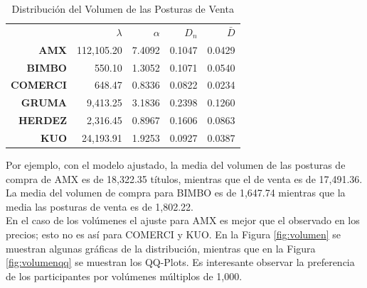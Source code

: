 \documentclass[11pt]{article}
\numberwithin{equation}{section} %
\begin{document}
\begin{table}[htbp]
\centering
\caption{Distribución del Volumen de las Posturas de Venta}
\renewcommand{\arraystretch}{1.2}
\begin{tabular}{r|r|r|r|r|}
\cline{2-5}
& $\lambda$ & $\alpha$ & $D_n$ & $\bar{D}$ \\
\cline{2-5}
\textbf{AMX} & 112,105.20 & 7.4092 & 0.1047 & 0.0429 \\
\textbf{BIMBO} & 550.10 & 1.3052 & 0.1071 & 0.0540 \\
\textbf{COMERCI} & 648.47 & 0.8336 & 0.0822 & 0.0234 \\
\textbf{GRUMA} & 9,413.25 & 3.1836 & 0.2398 & 0.1260 \\
\textbf{HERDEZ} & 2,316.45 & 0.8967 & 0.1606 & 0.0863 \\
\textbf{KUO} & 24,193.91 & 1.9253 & 0.0927 & 0.0387 \\
\cline{2-5}
\end{tabular}%
\label{tab:powervolumenventa}%
\end{table}%

Por ejemplo, con el modelo ajustado, la media del volumen de las posturas de compra de AMX es de 18,322.35 títulos, mientras que el de venta es de 17,491.36. La media del volumen de compra para BIMBO es de 1,647.74 mientras que la media las posturas de venta es de 1,802.22.\\

En el caso de los volúmenes el ajuste para AMX es mejor que el observado en los precios; esto no es así para COMERCI y KUO. En la Figura \ref{fig:volumen} se muestran algunas gráficas de la distribución, mientras que en la Figura \ref{fig:volumenqq} se muestran los QQ-Plots. Es interesante observar la preferencia de los participantes por volúmenes múltiplos de 1,000.
\end{document}

